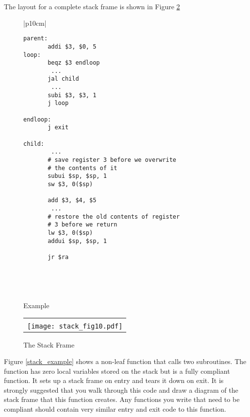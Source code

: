 The layout for a complete stack frame is shown in Figure \ref{stackframe}

%
%
\begin{figure}[!btp]

\begin{center}
\begin{tabular}{|p{10cm}|}
\hline
\begin{scriptsize}
\begin{verbatim}
parent:
       addi $3, $0, 5
loop:
       beqz $3 endloop
        ...
       jal child
        ...
       subi $3, $3, 1
       j loop

endloop:
       j exit

child:
        ...
       # save register 3 before we overwrite
       # the contents of it
       subui $sp, $sp, 1
       sw $3, 0($sp)

       add $3, $4, $5
        ...
       # restore the old contents of register
       # 3 before we return
       lw $3, 0($sp)
       addui $sp, $sp, 1

       jr $ra
\end{verbatim}
\end{scriptsize}
\\
\hline
\end{tabular}
\end{center}
\

\caption{Example}
\label{fig:paramexample}
\end{figure}


\begin{figure}[!hbtp]
\begin{footnotesize}
\begin{center}
\begin{tabular}{|p{8cm}|}
\hline
\\
\texttt{[image: stack\_fig10.pdf]}

\\
\hline
\end{tabular}
\end{center}
\end{footnotesize}

\caption{The Stack Frame}
\label{stackframe}
\end{figure}

Figure \ref{stack_example} shows a non-leaf function that calls two
subroutines. The function has zero local variables stored on the
stack but is a fully compliant function. It sets up a stack frame on
entry and tears it down on exit. It is strongly suggested that you
walk through this code and draw a diagram of the stack frame that this
function creates. Any functions you write that need to be compliant
should contain very similar entry and exit code to this function.

